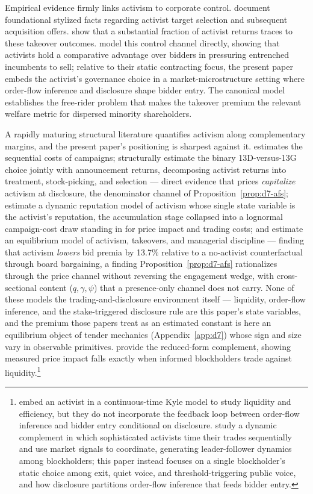 \documentclass[11pt]{article}
\newcommand{\1}{\mathbf{1}}
\begin{document}
Empirical evidence firmly links activism to corporate control. \citet{BravJiangPartnoyThomas2008} document foundational stylized facts regarding activist target selection and subsequent acquisition offers. \citet{GreenwoodSchor2009} show that a substantial fraction of activist returns traces to these takeover outcomes. \citet{CorumLevit2019} model this control channel directly, showing that activists hold a comparative advantage over bidders in pressuring entrenched incumbents to sell; relative to their static contracting focus, the present paper embeds the activist's governance choice in a market-microstructure setting where order-flow inference and disclosure shape bidder entry. The canonical \citet{GrossmanHart1980} model establishes the free-rider problem that makes the takeover premium the relevant welfare metric for dispersed minority shareholders.

A rapidly maturing structural literature quantifies activism along complementary margins, and the present paper's positioning is sharpest against it. \citet{Gantchev2013} estimates the sequential costs of campaigns; \citet{AlbuquerqueFosSchroth2022} structurally estimate the binary 13D-versus-13G choice jointly with announcement returns, decomposing activist returns into treatment, stock-picking, and selection --- direct evidence that prices \emph{capitalize} activism at disclosure, the denominator channel of Proposition~\ref{prop:d7-afs}; \citet{JohnsonSwem2021} estimate a dynamic reputation model of activism whose single state variable is the activist's reputation, the accumulation stage collapsed into a lognormal campaign-cost draw standing in for price impact and trading costs; and \citet{CelentanoLevine2025} estimate an equilibrium model of activism, takeovers, and managerial discipline --- finding that activism \emph{lowers} bid premia by 13.7\% relative to a no-activist counterfactual through board bargaining, a finding Proposition~\ref{prop:d7-afs} rationalizes through the price channel without reversing the engagement wedge, with cross-sectional content ($q,\gamma,\psi$) that a presence-only channel does not carry. None of these models the trading-and-disclosure environment itself --- liquidity, order-flow inference, and the stake-triggered disclosure rule are this paper's state variables, and the premium those papers treat as an estimated constant is here an equilibrium object of tender mechanics (Appendix~\ref{app:d7}) whose sign and size vary in observable primitives. \citet{CollinDufresneFos2015} provide the reduced-form complement, showing measured price impact falls exactly when informed blockholders trade against liquidity.\footnote{\citet{BackEtAl2018} embed an activist in a continuous-time Kyle model to study liquidity and efficiency, but they do not incorporate the feedback loop between order-flow inference and bidder entry conditional on disclosure. \citet{CetemenCisternasKolbViswanathan2026} study a dynamic complement in which sophisticated activists time their trades sequentially and use market signals to coordinate, generating leader-follower dynamics among blockholders; this paper instead focuses on a single blockholder's static choice among exit, quiet voice, and threshold-triggering public voice, and how disclosure partitions order-flow inference that feeds bidder entry.}
\end{document}
